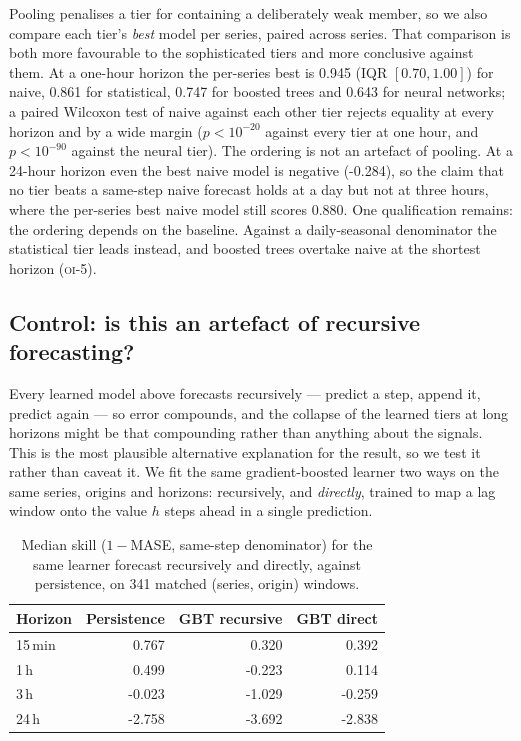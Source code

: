 \documentclass[11pt,a4paper]{article}
\newcommand{\num}[1]{#1}
\newcommand{\oi}[1]{\textsc{oi-#1}}
\begin{document}
Pooling penalises a tier for containing a deliberately weak member, so we also
compare each tier's \emph{best} model per series, paired across series. That
comparison is both more favourable to the sophisticated tiers and more
conclusive against them. At a one-hour horizon the per-series best is
\num{0.945} (IQR \([0.70, 1.00]\)) for naive, \num{0.861} for statistical,
\num{0.747} for boosted trees and \num{0.643} for neural networks; a paired
Wilcoxon test of naive against each other tier rejects equality at every horizon
and by a wide margin (\(p < 10^{-20}\) against every tier at one hour, and
\(p < 10^{-90}\) against the neural tier). The ordering is not an artefact of
pooling. At a 24-hour horizon even the best naive model is negative
(\num{-0.284}), so the claim that no tier beats a same-step naive forecast holds
at a day but not at three hours, where the per-series best naive model still
scores \num{0.880}. One qualification remains: the ordering depends on the baseline. Against a
daily-seasonal denominator the statistical tier leads instead, and boosted trees
overtake naive at the shortest horizon (\oi{5}).

\subsection{Control: is this an artefact of recursive forecasting?}
\label{sec:direct}

Every learned model above forecasts recursively --- predict a step, append it,
predict again --- so error compounds, and the collapse of the learned tiers at
long horizons might be that compounding rather than anything about the signals.
This is the most plausible alternative explanation for the result, so we test it
rather than caveat it. We fit the same gradient-boosted learner two ways on the
same series, origins and horizons: recursively, and \emph{directly}, trained to
map a lag window onto the value \(h\) steps ahead in a single prediction.

\begin{table}[t]
\centering
\caption{Median skill (\(1-\)MASE, same-step denominator) for the same learner
forecast recursively and directly, against persistence, on \num{341} matched
(series, origin) windows.}
\label{tab:direct}
\small
\begin{tabular}{lrrr}
\toprule
Horizon & Persistence & GBT recursive & GBT direct \\
\midrule
15\,min & \num{0.767} & \num{0.320} & \num{0.392} \\
1\,h    & \num{0.499} & \num{-0.223} & \num{0.114} \\
3\,h    & \num{-0.023} & \num{-1.029} & \num{-0.259} \\
24\,h   & \num{-2.758} & \num{-3.692} & \num{-2.838} \\
\bottomrule
\end{tabular}
\end{table}
\end{document}
